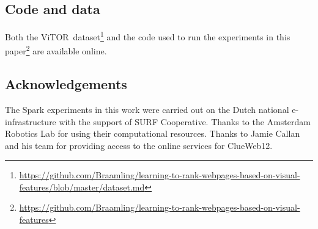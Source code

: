 \documentclass[sigconf,screen=true]{acmart}
\newcommand{\datasetname}{\ac{ViTOR}}
\begin{document}
%
%





\maketitle










\subsection*{Code and data}

Both the \datasetname~dataset\footnote{\url{https://github.com/Braamling/learning-to-rank-webpages-based-on-visual-features/blob/master/dataset.md}} and the code used to run the experiments in this paper\footnote{\url{https://github.com/Braamling/learning-to-rank-webpages-based-on-visual-features}} are available online.

\subsection*{Acknowledgements}
The Spark experiments in this work were carried out on the Dutch national e-infrastructure with the support of SURF Cooperative. Thanks to the Amsterdam Robotics Lab for using their computational resources. Thanks to Jamie Callan and his team for providing access to the online services for ClueWeb12. 

\newpage


 
\end{document}
